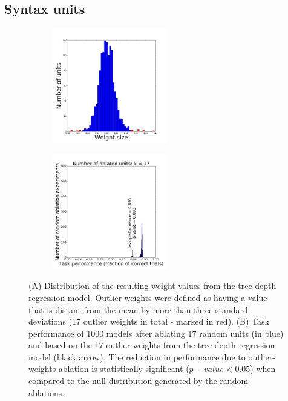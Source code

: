 \subsection{Syntax units}
\begin{figure}[t!]
    \centering
    \begin{subfigure}{0.3\textwidth}
            \centering
            \includegraphics[height=5cm]{Figures/weights_Ridge_synthetic_dist.png}
    \label{fig:fig1}
    \end{subfigure}
    \begin{subfigure}{0.3\textwidth}
            \centering
            \includegraphics[height=5cm]{Figures/null_distribution_ablation_experiment_k_17.png}
    \label{fig:fig2}
    \end{subfigure}
\caption{(A) Distribution of the resulting weight values from the tree-depth regression model. Outlier weights were defined as having a value that is distant from the mean by more than three standard deviations (17 outlier weights in total - marked in red). (B) Task performance of 1000 models after ablating 17 random units (in blue) and based on the 17 outlier weights from the tree-depth regression model (black arrow). The reduction in performance due to outlier-weights ablation is statistically significant ($p-value < 0.05$) when compared to the null distribution generated by the random ablations.}
\end{figure}

